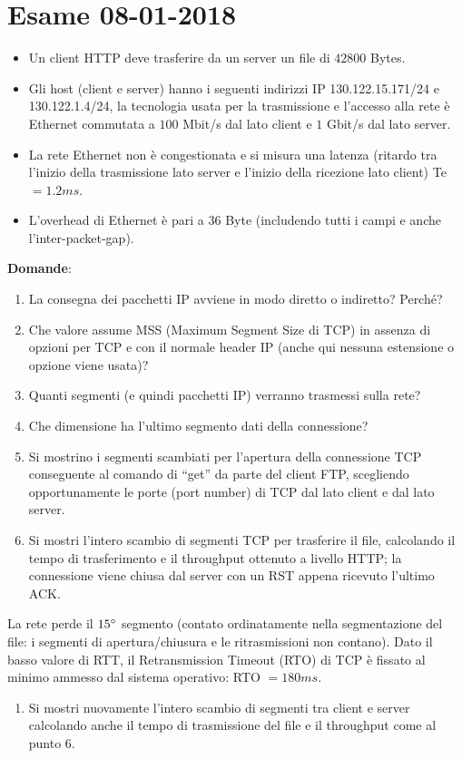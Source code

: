 \documentclass[10pt,a4paper]{article}
\begin{document}
	\section{Esame 08-01-2018}
	\begin{itemize}
		\item Un client HTTP deve trasferire da un server un file di $42800$ Bytes. 
		\item Gli host (client e server) hanno i seguenti indirizzi IP 130.122.15.171/24 e 130.122.1.4/24, la tecnologia usata per la trasmissione e l'accesso alla rete è Ethernet commutata a $100$ Mbit/s dal lato client e $1$ Gbit/s dal lato server. 
		\item La rete Ethernet non è congestionata e si misura una latenza (ritardo tra l'inizio della trasmissione lato server e l'inizio della ricezione lato client) Te $= 1.2 ms$. 
		\item L'overhead di Ethernet è pari a $36$ Byte (includendo tutti i campi e anche l'inter-packet-gap).
	\end{itemize}
	\textbf{Domande}:
	\begin{enumerate}
		\item La consegna dei pacchetti IP avviene in modo diretto o indiretto? Perché?
		\item Che valore assume MSS (Maximum Segment Size di TCP) in assenza di opzioni per TCP e con il normale header IP (anche qui nessuna estensione o opzione viene usata)?
		\item Quanti segmenti (e quindi pacchetti IP) verranno trasmessi sulla rete?
		\item Che dimensione ha l'ultimo segmento dati della connessione?
		\item Si mostrino i segmenti scambiati per l'apertura della connessione TCP conseguente al comando di “get” da parte del client FTP, scegliendo opportunamente le porte (port number) di TCP dal lato client e dal lato server.
		\item Si mostri l'intero scambio di segmenti TCP per trasferire il file, calcolando il tempo di trasferimento e il throughput ottenuto a livello HTTP; la connessione viene chiusa dal server con un RST appena ricevuto l'ultimo ACK.
	\end{enumerate}
	La rete perde il $15 \degree$ segmento (contato ordinatamente nella segmentazione del file: i segmenti di apertura/chiusura e le ritrasmissioni non contano). Dato il basso valore di RTT, il Retransmission Timeout (RTO) di TCP è fissato al minimo ammesso dal sistema operativo: RTO $=180ms$.
	\begin{enumerate}[resume]
		\item Si mostri nuovamente l'intero scambio di segmenti tra client e server calcolando anche il tempo di trasmissione del file e il throughput come al punto 6.
	\end{enumerate}
\end{document}
